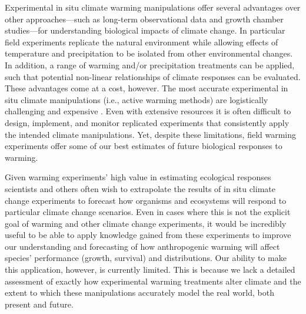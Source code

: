 \documentclass{article}
\begin{document}
\par Experimental in situ climate warming manipulations offer several advantages over other approaches---such as long-term observational data and growth chamber studies---for understanding biological impacts of climate change. In particular field experiments replicate the natural environment while allowing effects of temperature and precipitation to be isolated from other environmental changes. In addition, a range of warming and/or precipitation treatments can be applied, such that potential non-linear relationships of climate responses can be evaluated. These advantages come at a cost, however. The most accurate experimental in situ climate manipulations (i.e., active warming methods) are logistically challenging and expensive \citep{aronson2009}. Even with extensive resources it is often difficult to design, implement, and monitor replicated experiments that consistently apply the intended climate manipulations. Yet, despite these limitations, field warming experiments offer some of our best estimates of future biological responses to warming. 

\par Given warming experiments' high value in estimating ecological responses scientists and others often wish to extrapolate the results of in situ climate change experiments to forecast how organisms and ecosystems will respond to particular climate change scenarios. Even in cases where this is not the explicit goal of warming and other climate change experiments, it would be incredibly useful to be able to apply knowledge gained from these experiments to improve our understanding and forecasting of how anthropogenic warming will affect species' performance (growth, survival) and distributions. Our ability to make this application, however, is currently limited. This is because we lack a detailed assessment of exactly how experimental warming treatments alter climate and the extent to which these manipulations accurately model the real world, both present and future. 
\end{document}
